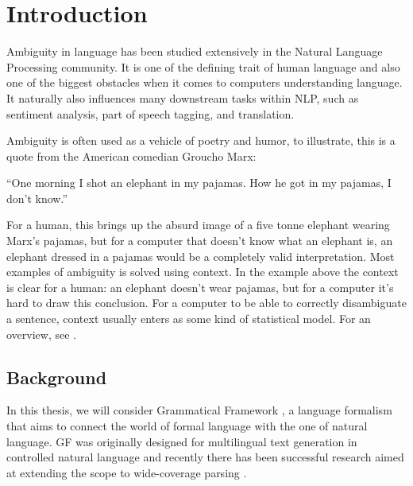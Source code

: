 \chapter{Introduction}
\label{chapter:introduction}

Ambiguity in language has been studied extensively in the Natural Language Processing community. It is one of the defining trait of human language and also one of the biggest obstacles when it comes to computers understanding language. It naturally also influences many downstream tasks within NLP, such as sentiment analysis, part of speech tagging, and translation.


Ambiguity is often used as a vehicle of poetry and humor, to illustrate, this is a quote from the American comedian Groucho Marx: 
\begin{quoting}
``One morning I shot an elephant in my pajamas. How he got in my pajamas, I don't know.''
\end{quoting}
For a human, this brings up the absurd image of a five tonne elephant wearing Marx's pajamas, but for a computer that doesn't know what an elephant is, an elephant dressed in a pajamas would be a completely valid interpretation. Most examples of ambiguity is solved using context. In the example above the context is clear for a human: an elephant doesn't wear pajamas, but for a computer it's hard to draw this conclusion. For a computer to be able to correctly disambiguate a sentence, context usually enters as some kind of statistical model. For an overview, see \citet[Chapter 14]{jurafsky2009speech}.

\section{Background}
In this thesis, we will consider Grammatical Framework \citep{ranta2004grammatical}, a language formalism that aims to connect the world of formal language with the one of natural language. GF was originally designed for multilingual text generation in controlled natural language \citep{kolachina2017ud2gf} and recently there has been successful research aimed at extending the scope to wide-coverage parsing \citep{angelov2014fast}. 

